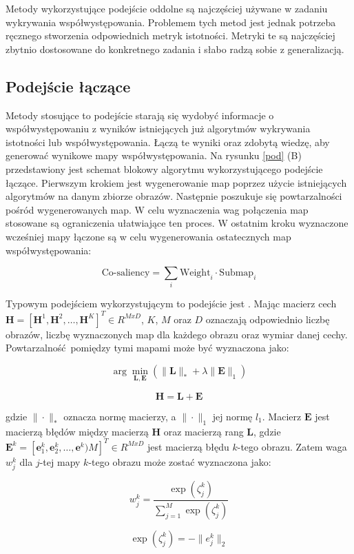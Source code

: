 \documentclass[a4paper,11pt, notitlepage, twosides, openany ]{report}
\begin{document}
	Metody wykorzystujące podejście oddolne są najczęściej używane w zadaniu wykrywania współwystępowania. Problemem tych metod jest jednak potrzeba ręcznego stworzenia odpowiednich metryk istotności. Metryki te są najczęściej zbytnio dostosowane do konkretnego zadania i słabo radzą sobie z generalizacją.

	\subsection{Podejście łączące}
	Metody stosujące to podejście starają się wydobyć informacje o współwystępowaniu z wyników istniejących już algorytmów wykrywania istotności lub współwystępowania. Łączą te wyniki oraz zdobytą wiedzę, aby generować wynikowe mapy współwystępowania. Na rysunku \ref{pod} (B) przedstawiony jest schemat blokowy algorytmu wykorzystującego podejście łączące. Pierwszym krokiem jest wygenerowanie map poprzez użycie istniejących algorytmów na danym zbiorze obrazów. Następnie poszukuje się powtarzalności pośród wygenerowanych map. W celu wyznaczenia wag połączenia map stosowane są ograniczenia ułatwiające ten proces. W ostatnim kroku wyznaczone wcześniej mapy łączone są w celu wygenerowania ostatecznych map współwystępowania:

	$$
	\text{Co-saliency} = \sum_i \text{Weight}_i \cdot \text{Submap}_i
	$$

	Typowym podejściem wykorzystującym to podejście jest \cite{midfeatex}. Mając macierz cech $\mathbf{H} = [\mathbf{H}^1, \mathbf{H}^2, \dots, \mathbf{H}^K]^T \in R^{M x D}$, $K$, $M$ oraz $D$ oznaczają odpowiednio liczbę obrazów, liczbę wyznaczonych map dla każdego obrazu oraz wymiar danej cechy. Powtarzalność pomiędzy tymi mapami może być wyznaczona jako:

	$$
	\arg\min_{\mathbf{L}, \mathbf{E}} \left(\|\mathbf{L}\|_* + \lambda\|\mathbf{E}\|_1\right)
	$$

	$$
	\mathbf{H} = \mathbf{L} + \mathbf{E}
	$$

	gdzie $\|\cdot\|_*$ oznacza normę macierzy, a $\|\cdot\|_1$ jej normę $l_1$. Macierz $\mathbf{E}$ jest macierzą błędów między macierzą $\mathbf{H}$ oraz macierzą rang $\mathbf{L}$, gdzie $\mathbf{E}^k=[\mathbf{e}^k_1, \mathbf{e}^k_2, \dots, \mathbf{e}^k)M]^T \in R^{M x D}$ jest macierzą błędu $k$-tego obrazu. Zatem waga $w^k_j$ dla $j$-tej mapy $k$-tego obrazu może zostać wyznaczona jako:

	$$
	w^k_j = \frac{\exp(\zeta^k_j)}{\sum^M_{j=1}\exp(\zeta^k_j)}
	$$

	$$
	\exp(\zeta^k_j) = -\|e^k_j\|_2
	$$
	
\end{document}
